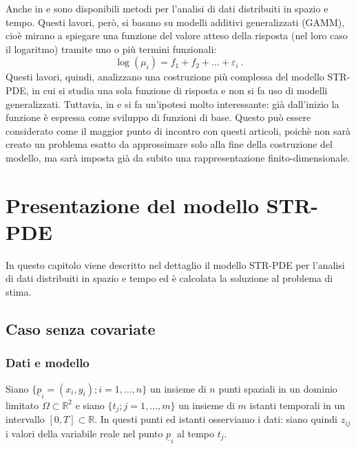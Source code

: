 \documentclass[a4paper,11pt,twoside,openright]{book}							%
\begin{document}
Anche in \cite{art:augustin} e \cite{art:marra} sono disponibili metodi per l'analisi di dati distribuiti in spazio e tempo. Questi lavori, però, si basano su modelli additivi generalizzati (GAMM), cioè mirano a spiegare una funzione del valore atteso della risposta (nel loro caso il logaritmo) tramite uno o più termini funzionali:
$$
\log(\mu_i)= f_1+f_2+ \ldots +\varepsilon_i \ .
$$
Questi lavori, quindi, analizzano una costruzione più complessa del modello STR-PDE, in cui si studia una sola funzione di risposta e non si fa uso di modelli generalizzati. Tuttavia, in \cite{art:augustin} e \cite{art:marra} si fa un'ipotesi molto interessante: già dall'inizio la funzione è espressa come sviluppo di funzioni di base. Questo può essere considerato come il maggior punto di incontro con questi articoli, poichè non sarà creato un problema esatto da approssimare solo alla fine della costruzione del modello, ma sarà imposta già da subito una rappresentazione finito-dimensionale.


\chapter{Presentazione del modello STR-PDE}
\label{cap:modello}
In questo capitolo viene descritto nel dettaglio il modello STR-PDE per l'analisi di dati distribuiti in spazio e tempo ed è calcolata la soluzione al problema di stima.


\section{Caso senza covariate}

\subsection{Dati e modello}

Siano $\{\underline p_i = (x_i,y_i); i=1, \ldots , n\}$ un insieme di $n$ punti spaziali in un dominio limitato $\Omega \subset \mathbb R^2$ e siano $\{t_j ; j=1, \ldots , m\}$ un insieme di $m$ istanti temporali in un intervallo $[0,T]\subset \mathbb R$. In questi punti ed istanti osserviamo i dati: siano quindi $z_{ij}$ i valori della variabile reale nel punto $\underline p_i$ al tempo $t_j$.
\end{document}
